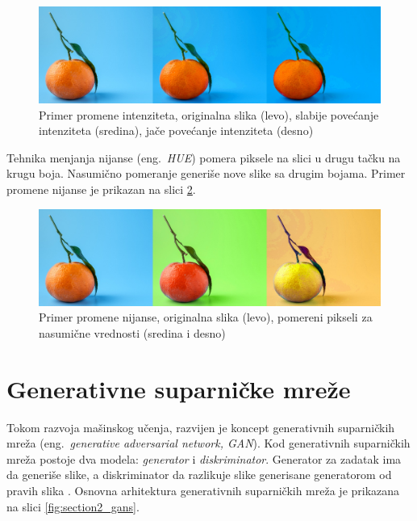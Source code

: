 \documentclass[12pt,oneside]{memoir}
\begin{document}
\begin{figure}[ht]
    \centering
    \includegraphics[width=1\textwidth]{matfmaster/glava3/saturation.jpg}
    \caption{Primer promene intenziteta, originalna slika (levo), slabije povećanje intenziteta (sredina), jače povećanje intenziteta (desno) \cite{unsplashOrange}} 
    \label{fig:section3_saturation}
\end{figure}

Tehnika menjanja nijanse (eng.~\textit{HUE}) pomera piksele na slici u drugu tačku na krugu boja. Nasumično pomeranje generiše nove slike sa drugim bojama. Primer promene nijanse je prikazan na slici \ref{fig:section3_hue}.


\begin{figure}[ht]
    \centering
    \includegraphics[width=1\textwidth]{matfmaster/glava3/hue.jpg}
    \caption{Primer promene nijanse, originalna slika (levo), pomereni pikseli za nasumične vrednosti (sredina i desno) \cite{unsplashOrange}} 
    \label{fig:section3_hue}
\end{figure}

\section{Generativne suparničke mreže}
\label{section3_increasedata_gan}

Tokom razvoja mašinskog učenja, razvijen je koncept generativnih suparničkih mreža (eng.~\textit{generative adversarial network, GAN}). Kod generativnih suparničkih mreža postoje dva modela: \textit{generator} i \textit{diskriminator}. Generator za zadatak ima da generiše slike, a diskriminator da razlikuje slike generisane generatorom od pravih slika \cite{goodfellow2014generative}.
Osnovna arhitektura generativnih suparničkih mreža je prikazana na slici \ref{fig:section2_gans}.
\end{document}
